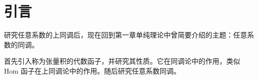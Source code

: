 \section{引言}
研究任意系数的上同调后，现在回到第一章单纯理论中曾简要介绍的主题：任意系数的同调。

首先引入称为张量积的代数函子，并研究其性质。它在同调论中的作用，类似 Hom 函子在上同调论中的作用。随后研究任意系数同调。
